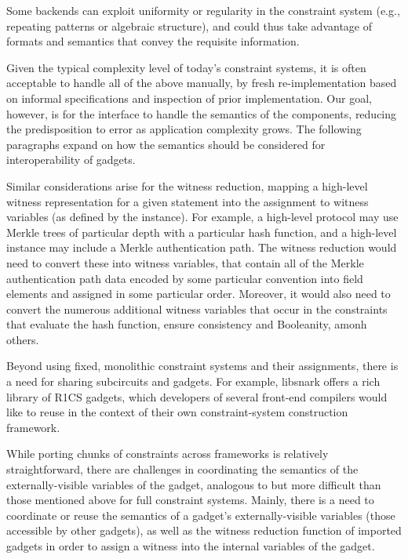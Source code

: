 \documentclass[a4paper,12pt]{article}
\begin{document}
Some backends can exploit uniformity or regularity in the constraint system (e.g., repeating patterns or algebraic structure), and could thus take advantage of formats and semantics that convey the requisite information.

Given the typical complexity level of today’s constraint systems, it is often acceptable to handle all of the above manually, by fresh re-implementation based on informal specifications and inspection of prior implementation. Our goal, however, is for the interface to handle the semantics of the components, reducing the predisposition to error as application complexity grows. The following paragraphs expand on how the semantics should be considered for interoperability of gadgets.

Similar considerations arise for the witness reduction, mapping a high-level witness representation for a given statement into the assignment to witness variables (as defined by the instance). For example, a high-level protocol may use Merkle trees of particular depth with a particular hash function, and a high-level instance may include a Merkle authentication path. The witness reduction would need to convert these into witness variables, that contain all of the Merkle authentication path data encoded by some particular convention into field elements and assigned in some particular order. Moreover, it would also need to convert the numerous additional witness variables that occur in the constraints that evaluate the hash function, ensure consistency and Booleanity, amonh others.

Beyond using fixed, monolithic constraint systems and their assignments, there is a need for sharing subcircuits and gadgets. For example, libsnark offers a rich library of R1CS gadgets, which developers of several front-end compilers would like to reuse in the context of their own constraint-system construction framework. 

While porting chunks of constraints across frameworks is relatively straightforward, there are challenges in coordinating the semantics of the externally-visible variables of the gadget, analogous to but more difficult than those mentioned above for full constraint systems. Mainly, there is a need to coordinate or reuse the semantics of a gadget’s externally-visible variables (those accessible by other gadgets), as well as the witness reduction function of imported gadgets in order to assign a witness into the internal variables of the gadget.
\end{document}
